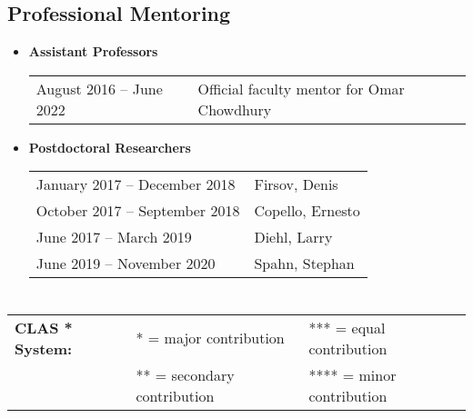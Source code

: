 \documentclass[10pt]{article}
\begin{document}
\begin{IOWA ONLY}
\begin{itemize}
\end{itemize}


\subsection*{Professional Mentoring}
\smallskip

\begin{itemize}
\item[] \textbf{Assistant Professors}
\\[1.3ex]
\begin{tabular}{l@{\quad\ }p{30em}} 
 August 2016 -- June 2022
 & Official faculty mentor for Omar Chowdhury
\end{tabular}

\item[] \textbf{Postdoctoral Researchers}
\\[1.3ex]
\begin{tabular}{l@{\quad\ }p{30em}} 
 January 2017 -- December 2018
 & Firsov, Denis
 \\[3.5ex]
  October 2017 -- September 2018
 & Copello, Ernesto
 \\[3.5ex]
 June 2017 -- March 2019
 & Diehl, Larry
 \\[3.5ex]
 June 2019 -- November 2020
 & Spahn, Stephan
 \\[3.5ex]
\end{tabular}

\end{itemize}

\end{IOWA ONLY}


\section*{\scholarship}

\begin{IOWA ONLY}
\begin{center}
\begin{tabular}{lll}
{\bf CLAS * System:} & * = major contribution   &    *** = equal contribution \\
                     & ** = secondary contribution & **** = minor contribution
\end{tabular}
\end{center}
\end{IOWA ONLY}
\end{document}
